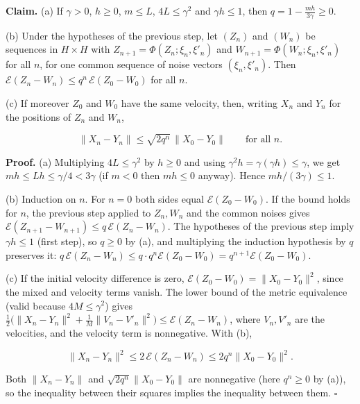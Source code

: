 \documentclass[11pt,a4paper]{article}
\begin{document}
\textbf{Claim.} (a) If \(\gamma>0\), \(h\ge0\), \(m\le L\), \(4L\le\gamma^2\) and \(\gamma h\le1\), then \(q=1-\frac{mh}{3\gamma}\ge0\).




(b) Under the hypotheses of the previous step, let \((Z_n)\) and \((W_n)\) be sequences in \(H\times H\) with \(Z_{n+1}=\Phi(Z_n;\xi_n,\xi'_n)\) and \(W_{n+1}=\Phi(W_n;\xi_n,\xi'_n)\) for all \(n\), for one common sequence of noise vectors \((\xi_n,\xi'_n)\). Then \(\mathcal E(Z_n-W_n)\le q^n\,\mathcal E(Z_0-W_0)\) for all \(n\).




(c) If moreover \(Z_0\) and \(W_0\) have the same velocity, then, writing \(X_n\) and \(Y_n\) for the positions of \(Z_n\) and \(W_n\),


\[\|X_n-Y_n\|\le\sqrt{2q^n}\,\|X_0-Y_0\|\qquad\text{for all }n .\]


\textbf{Proof.} (a) Multiplying \(4L\le\gamma^2\) by \(h\ge0\) and using \(\gamma^2h=\gamma(\gamma h)\le\gamma\), we get \(mh\le Lh\le\gamma/4<3\gamma\) (if \(m<0\) then \(mh\le0\) anyway). Hence \(mh/(3\gamma)\le1\).




(b) Induction on \(n\). For \(n=0\) both sides equal \(\mathcal E(Z_0-W_0)\). If the bound holds for \(n\), the previous step applied to \(Z_n,W_n\) and the common noises gives \(\mathcal E(Z_{n+1}-W_{n+1})\le q\,\mathcal E(Z_n-W_n)\). The hypotheses of the previous step imply \(\gamma h\le1\) (first step), so \(q\ge0\) by (a), and multiplying the induction hypothesis by \(q\) preserves it: \(q\,\mathcal E(Z_n-W_n)\le q\cdot q^n\mathcal E(Z_0-W_0)=q^{n+1}\mathcal E(Z_0-W_0)\).




(c) If the initial velocity difference is zero, \(\mathcal E(Z_0-W_0)=\|X_0-Y_0\|^2\), since the mixed and velocity terms vanish. The lower bound of the metric equivalence (valid because \(4M\le\gamma^2\)) gives \(\frac12\bigl(\|X_n-Y_n\|^2+\frac1M\|V_n-V'_n\|^2\bigr)\le\mathcal E(Z_n-W_n)\), where \(V_n,V'_n\) are the velocities, and the velocity term is nonnegative. With (b),


\[\|X_n-Y_n\|^2\le2\,\mathcal E(Z_n-W_n)\le2q^n\|X_0-Y_0\|^2 .\]


Both \(\|X_n-Y_n\|\) and \(\sqrt{2q^n}\|X_0-Y_0\|\) are nonnegative (here \(q^n\ge0\) by (a)), so the inequality between their squares implies the inequality between them. \(\square\)
\end{document}
